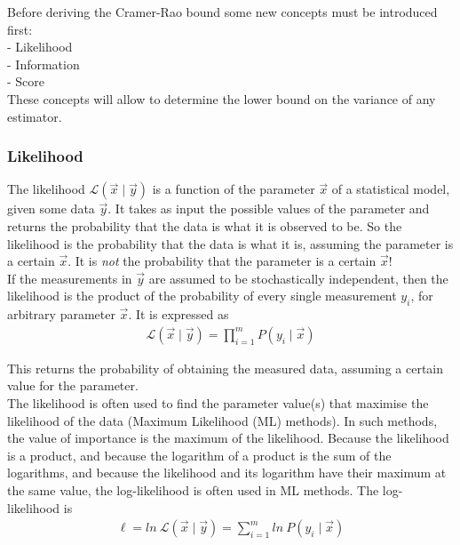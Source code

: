 \documentclass[report,12pt]{report}
\begin{document}
Before deriving the Cramer-Rao bound some new concepts must be introduced first:\\
- Likelihood\\
- Information\\
- Score\\
These concepts will allow to determine the lower bound on the variance of any estimator.




\subsubsection*{Likelihood}
The likelihood $\mathcal{L}(\vec x \mid \vec y)$ is a function of the parameter $\vec x$ of a statistical model, given some data $\vec y$. It takes as input the possible values of the parameter and returns the probability that the data is what it is observed to be. So the likelihood is the probability that the data is what it is, assuming the parameter is a certain $\vec x$. It is \emph{not} the probability that the parameter is a certain $\vec x$!\\

If the measurements in $\vec{y}$ are assumed to be stochastically independent, then the likelihood is the product of the probability of every single measurement $y_i$, for arbitrary parameter $\vec x$. It is expressed as
\begin{align}
	\mathcal{L}(\vec x \mid \vec y) = 
	\prod_{i=1}^{m} P\left( y_i \mid \vec x \right)
	\label{eq:likelihood}
\end{align}

This returns the probability of obtaining the measured data, assuming a certain value for the parameter.\\

The likelihood is often used to find the parameter value(s) that maximise the likelihood of the data (Maximum Likelihood (ML) methods). In such methods, the value of importance is the maximum of the likelihood. Because the likelihood is a product, and because the logarithm of a product is the sum of the logarithms, and because the likelihood and its logarithm have their maximum at the same value, the log-likelihood is often used in ML methods. The log-likelihood is
\begin{align}
	\ell = ln\ \mathcal{L} \left( \vec x \mid \vec y \right)
	= \sum_{i=1}^{m} ln\ P(y_i\mid\vec x)
	\label{eq:logLikelihood}
\end{align}
\end{document}
